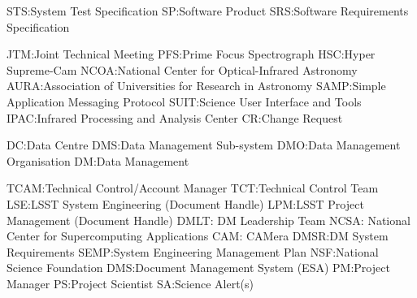 STS:System Test Specification
SP:Software Product
SRS:Software Requirements Specification

JTM:Joint Technical Meeting
PFS:Prime Focus Spectrograph
HSC:Hyper Supreme-Cam
NCOA:National Center for Optical-Infrared Astronomy 
AURA:Association of Universities for Research in Astronomy
SAMP:Simple Application Messaging Protocol
SUIT:Science User Interface and Tools
IPAC:Infrared Processing and Analysis Center 
CR:Change Request

DC:Data Centre
DMS:Data Management Sub-system
DMO:Data Management Organisation
DM:Data Management

TCAM:Technical Control/Account Manager
TCT:Technical Control Team
LSE:LSST System Engineering (Document Handle)
LPM:LSST Project Management (Document Handle)
DMLT: DM Leadership Team
NCSA: National Center for Supercomputing Applications
CAM: CAMera
DMSR:DM System Requirements
SEMP:System Engineering Management Plan
NSF:National Science Foundation
DMS:Document Management System (ESA)
PM:Project Manager
PS:Project Scientist
SA:Science Alert(s)

